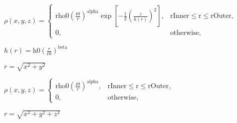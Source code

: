 \documentclass[a4paper,14pt]{extarticle}
\renewenvironment{equation}
{\preview$\displaystyle}
{$\endpreview}
\begin{document}
\begin{equation}
\rho(\mathit{x},\mathit{y},\mathit{z}) = \begin{cases}
               \mathrm{rho0} \left(\frac{\mathrm{r0}}{r}\right)^\mathrm{alpha} \exp\left[-\frac{1}{2}\left(\frac{ \mathit{z}}{h(r)}\right)^2\right],       &  \mathrm{rInner} \le \mathrm{r} \le  \mathrm{rOuter}, \\
               0,& \text{otherwise},          \end{cases}
\end{equation}

\begin{equation}
 h(r)=\mathrm{h0}\left(\frac{r}{\mathrm{r0}}\right)^\mathrm{beta}
\end{equation}

\begin{equation}
 r=\sqrt{\mathit{x}^2+\mathit{y}^2}
\end{equation}

\begin{equation}
\rho(\mathit{x},\mathit{y},\mathit{z}) = \begin{cases}
               \mathrm{rho0} \left(\frac{\mathrm{r0}}{r}\right)^\mathrm{alpha},       &  \mathrm{rInner} \le \mathrm{r} \le  \mathrm{rOuter}, \\
               0,& \text{otherwise},          \end{cases}
\end{equation}

\begin{equation}
 r=\sqrt{\mathit{x}^2+\mathit{y}^2+\mathit{z}^2}
\end{equation}
\end{document}
